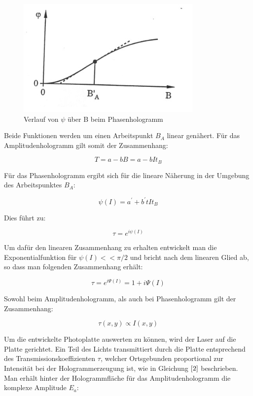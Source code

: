 \documentclass[12pt,a4paper]{article}
\begin{document}
\begin{figure}[h]
	\includegraphics[scale = 0.5]{Phasentrans.png}
	\centering
	\caption{Verlauf von $\psi$ über B beim Phasenhologramm}
	\label{44}
\end{figure}

Beide Funktionen werden um einen Arbeitspunkt $B_{A}$ linear genähert. Für das Amplitudenhologramm gilt somit der Zusammenhang:

\begin{equation}
T = a- bB = a-bIt_{B}
\label {1}
\end{equation}

Für das Phasenhologramm ergibt sich für die lineare Näherung in der Umgebung des Arbeitspunktes $B_{A}$:

\begin{equation}
\psi(I) = a^{'} + b^{'}tIt_{B}
\label {1}
\end{equation}

Dies führt zu:

\begin{equation}
\tau = e^{i\psi(I)} 
\label {1}
\end{equation}

Um dafür den linearen Zusammenhang zu erhalten entwickelt man die Exponentialfunktion für $\psi(I) << \pi/2$ und bricht nach dem linearen Glied ab, so dass man folgenden Zusammenhang erhält:

\begin{equation}
\tau = e^{i\Psi(I)} = 1 + i\Psi(I)
\label {3}
\end{equation}

Sowohl beim Amplitudenhologramm, als auch bei Phasenhologramm gilt der Zusammenhang:

\begin{equation}
\tau(x,y) \propto I(x,y)
\label {2}
\end{equation}

Um die entwickelte Photoplatte auswerten zu können, wird der Laser auf die Platte gerichtet. Ein Teil des Lichts transmittiert durch die Platte entsprechend des Transmissionskoeffizienten $\tau$, welcher  Ortsgebunden proportional zur Intensität bei der Hologrammerzeugung ist, wie in Gleichung $\ref{2}$ beschrieben. Man erhält hinter der Hologrammfläche für das Amplitudenhologramm die komplexe Amplitude $E_{a}$:
\end{document}
